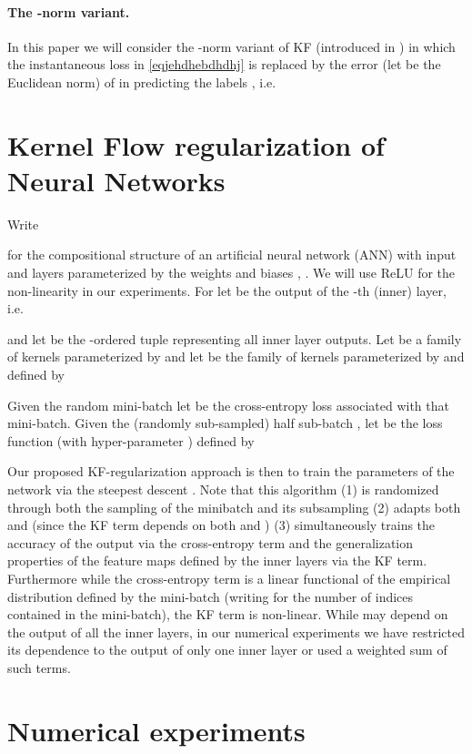 \documentclass[11pt]{article}
\begin{document}
\paragraph{The -norm variant.}
In this paper we will consider the -norm variant of KF (introduced in \cite[Sec.~10]{owhadi2019kernel}) in which the instantaneous loss  in \eqref{eqjehdhebdhdhj} is replaced by the error (let  be the Euclidean   norm)  of  in predicting the labels , i.e.




\section{Kernel Flow regularization of Neural Networks}\label{KF reg}
Write

for the compositional structure of an artificial neural network (ANN) with input  and  layers
 parameterized by the weights and biases , . We will use ReLU for the  non-linearity  in our experiments.
For   let  be the output of the -th (inner)  layer, i.e.

 and let   be the -ordered tuple representing all inner layer outputs.
Let   be a family of kernels parameterized by  and let  be the family of kernels parameterized by  and  defined by


Given the random mini-batch  let   be the cross-entropy loss associated with that mini-batch. Given the (randomly sub-sampled) half sub-batch ,
 let  be the loss function (with   hyper-parameter ) defined by


Our proposed KF-regularization approach is then to train the parameters  of the network  via the steepest descent .
Note that this algorithm (1) is randomized through both the sampling of the minibatch and its subsampling (2) adapts both  and  (since the KF term depends on both  and )  (3) simultaneously trains the accuracy of the output via the cross-entropy term and the generalization properties of the feature maps defined by the inner layers via the KF term. Furthermore while  the cross-entropy term is a linear functional of the empirical distribution  defined by the mini-batch (writing  for the number of indices contained in the mini-batch), the KF term is non-linear.
While  may depend on the output of all the inner layers, in our numerical experiments we have restricted its
dependence to the output of only one inner layer or used a weighted sum of such terms.


\section{Numerical experiments}
\end{document}
